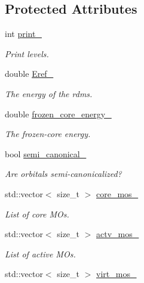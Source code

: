 \subsection*{Protected Attributes}
\begin{DoxyCompactItemize}
\item 
int \mbox{\hyperlink{classforte_1_1_d_s_r_g___m_r_p_t_addf6354a1a878796bddaf04cd377f2f7}{print\+\_\+}}
\begin{DoxyCompactList}\small\item\em Print levels. \end{DoxyCompactList}\item 
double \mbox{\hyperlink{classforte_1_1_d_s_r_g___m_r_p_t_a6b96d621e3be2f4958bc0a7c365b16d7}{Eref\+\_\+}}
\begin{DoxyCompactList}\small\item\em The energy of the rdms. \end{DoxyCompactList}\item 
double \mbox{\hyperlink{classforte_1_1_d_s_r_g___m_r_p_t_a123fe7309531ea7b0ff467b2a853eb12}{frozen\+\_\+core\+\_\+energy\+\_\+}}
\begin{DoxyCompactList}\small\item\em The frozen-\/core energy. \end{DoxyCompactList}\item 
bool \mbox{\hyperlink{classforte_1_1_d_s_r_g___m_r_p_t_a7b7f73082944dd1810a6907083860aeb}{semi\+\_\+canonical\+\_\+}}
\begin{DoxyCompactList}\small\item\em Are orbitals semi-\/canonicalized? \end{DoxyCompactList}\item 
std\+::vector$<$ size\+\_\+t $>$ \mbox{\hyperlink{classforte_1_1_d_s_r_g___m_r_p_t_a900be495017b4905196510bdccce3435}{core\+\_\+mos\+\_\+}}
\begin{DoxyCompactList}\small\item\em List of core M\+Os. \end{DoxyCompactList}\item 
std\+::vector$<$ size\+\_\+t $>$ \mbox{\hyperlink{classforte_1_1_d_s_r_g___m_r_p_t_aaabe340bc053bc0ef8904ffbf2b7d3a4}{actv\+\_\+mos\+\_\+}}
\begin{DoxyCompactList}\small\item\em List of active M\+Os. \end{DoxyCompactList}\item 
std\+::vector$<$ size\+\_\+t $>$ \mbox{\hyperlink{classforte_1_1_d_s_r_g___m_r_p_t_aff0036190f9b8d4f0bfdeecad90903f5}{virt\+\_\+mos\+\_\+}}

\end{DoxyCompactItemize}
